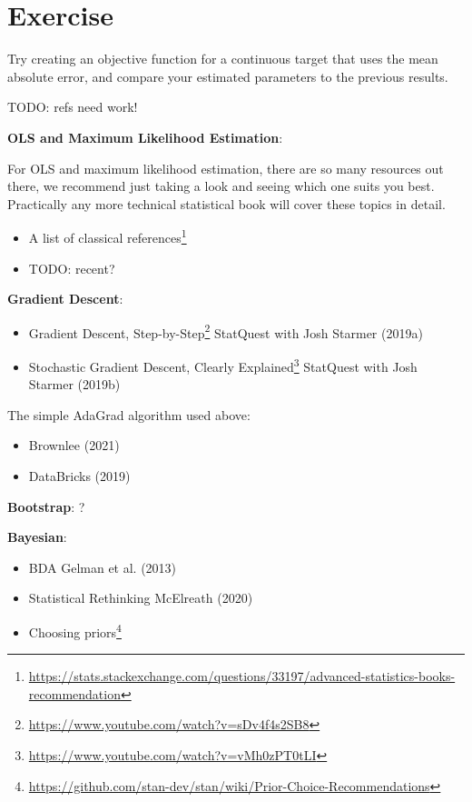 \documentclass[
  letterpaper,
]{krantz}
\providecommand{\tightlist}{%
  \setlength{\itemsep}{0pt}\setlength{\parskip}{0pt}}\usepackage{longtable,booktabs,array}
\DeclareRobustCommand{\href}[2]{#2\footnote{\url{#1}}}
\begin{document}
\section{Exercise}\label{exercise-1}

Try creating an objective function for a continuous target that uses the
mean absolute error, and compare your estimated parameters to the
previous results.

TODO: refs need work!

\textbf{OLS and Maximum Likelihood Estimation}:

For OLS and maximum likelihood estimation, there are so many resources
out there, we recommend just taking a look and seeing which one suits
you best. Practically any more technical statistical book will cover
these topics in detail.

\begin{itemize}
\tightlist
\item
  \href{https://stats.stackexchange.com/questions/33197/advanced-statistics-books-recommendation}{A
  list of classical references}
\item
  TODO: recent?
\end{itemize}

\textbf{Gradient Descent}:

\begin{itemize}
\tightlist
\item
  \href{https://www.youtube.com/watch?v=sDv4f4s2SB8}{Gradient Descent,
  Step-by-Step} StatQuest with Josh Starmer (2019a)
\item
  \href{https://www.youtube.com/watch?v=vMh0zPT0tLI}{Stochastic Gradient
  Descent, Clearly Explained} StatQuest with Josh Starmer (2019b)
\end{itemize}

The simple AdaGrad algorithm used above:

\begin{itemize}
\tightlist
\item
  Brownlee (2021)
\item
  DataBricks (2019)
\end{itemize}

\textbf{Bootstrap}: ?

\textbf{Bayesian}:

\begin{itemize}
\tightlist
\item
  BDA Gelman et al. (2013)
\item
  Statistical Rethinking McElreath (2020)
\item
  \href{https://github.com/stan-dev/stan/wiki/Prior-Choice-Recommendations}{Choosing
  priors}
\end{itemize}
\end{document}
